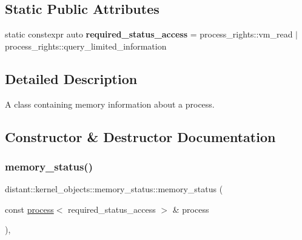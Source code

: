 \subsection*{Static Public Attributes}
\begin{DoxyCompactItemize}
\item 
\mbox{\label{classdistant_1_1kernel__objects_1_1memory__status_a2473cb4a29119760e23570b6e61cc168}} 
static constexpr auto {\bfseries required\+\_\+status\+\_\+access} = process\+\_\+rights\+::vm\+\_\+read $\vert$ process\+\_\+rights\+::query\+\_\+limited\+\_\+information
\end{DoxyCompactItemize}


\subsection{Detailed Description}
A class containing memory information about a process. 

\subsection{Constructor \& Destructor Documentation}
\mbox{\label{classdistant_1_1kernel__objects_1_1memory__status_a267b6aad3f1ea1ff0e8e203c8a66ff35}} 
\subsubsection{\texorpdfstring{memory\+\_\+status()}{memory\_status()}}
{\footnotesize\ttfamily distant\+::kernel\+\_\+objects\+::memory\+\_\+status\+::memory\+\_\+status (\begin{DoxyParamCaption}\item[{const \mbox{\hyperlink{classdistant_1_1kernel__objects_1_1process}{process}}$<$ required\+\_\+status\+\_\+access $>$ \&}]{process }\end{DoxyParamCaption})\hspace{0.3cm}{\ttfamily [inline]}, {\ttfamily [explicit]}}



